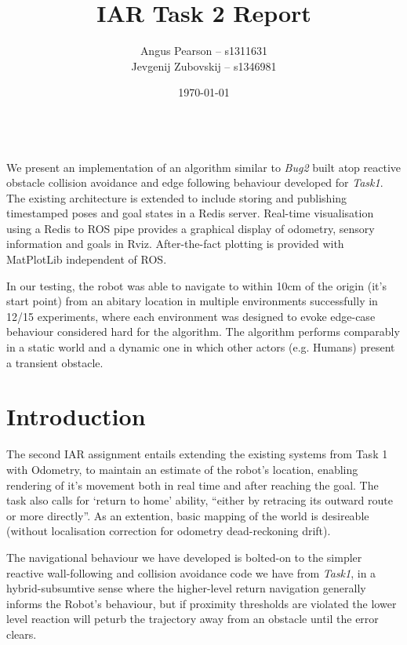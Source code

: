 \documentclass[11pt, a4paper]{article}
\renewenvironment{abstract}{%
{\mdseries\scshape\Large\abstractname}
\vspace{1em}\\
}{\par\noindent}
\begin{document}
\title{IAR Task 2 Report}
\author{Angus Pearson -- s1311631\\ Jevgenij Zubovskij -- s1346981}
\date{\today}
\maketitle



\begin{abstract}
  We present an implementation of an algorithm similar to \textit{Bug2} \cite{principlesrobot} 
  built atop reactive obstacle collision avoidance and edge following behaviour developed for 
  \textit{Task1}. The existing architecture is extended to include storing and publishing 
  timestamped poses and goal states in a Redis \cite{Redis} server.
  Real-time visualisation using a Redis to ROS \cite{ROS} pipe provides a graphical display 
  of odometry, sensory information and goals in Rviz. After-the-fact plotting is provided 
  with MatPlotLib independent of ROS.

  In our testing, the robot was able to navigate to within 10cm of the origin (it's start point) 
  from an abitary location in multiple environments successfully in 12/15 experiments, where each 
  environment was designed to evoke edge-case behaviour considered hard for the algorithm. The 
  algorithm performs comparably in a static world and a dynamic one in which other actors 
  (e.g. Humans) present a transient obstacle. 
\end{abstract}



\section{Introduction}

The second IAR assignment entails extending the existing systems from Task 1 with Odometry, 
to maintain an estimate of the robot's location, enabling rendering of it's movement both 
in real time and after reaching the goal. The task also calls for `return to home' ability, 
``either by retracing its outward route or more directly''. As an extention, basic mapping 
of the world is desireable (without localisation correction for odometry dead-reckoning drift). 

The navigational behaviour we have developed is bolted-on to the simpler reactive wall-following
and collision avoidance code we have from \textit{Task1}, in a hybrid-subsumtive sense where the
higher-level return navigation generally informs the Robot's behaviour, but if proximity thresholds
are violated the lower level reaction will peturb the trajectory away from an obstacle until the
error clears.
\end{document}
